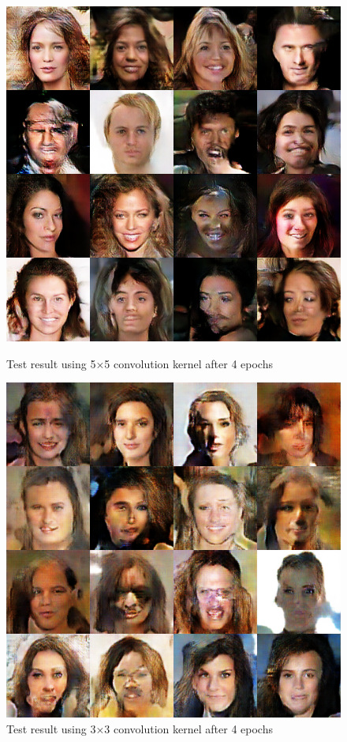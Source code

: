 \begin{figure}
    \begin{minipage}[t]{0.48\linewidth}
        \centering
        \includegraphics[width=\textwidth]{figures/result_conv_kernel_5.png}
        \caption{Test result using 5×5 convolution kernel after 4 epochs}
        \label{conv_kernel_5}
    \end{minipage}
        \hfill
    \begin{minipage}[t]{0.48\linewidth}
        \centering
        \includegraphics[width=\textwidth]{figures/result_conv_kernel_3.png}
        \caption{Test result using 3×3 convolution kernel after 4 epochs}
        \label{conv_kernel_3}
    \end{minipage}
\end{figure}


